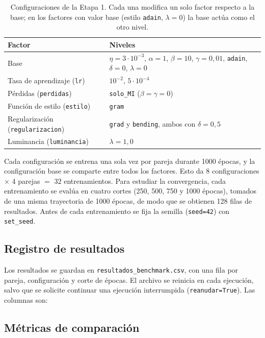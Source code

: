 \documentclass[a4paper]{article}
\begin{document}
\begin{table}[h]
\centering
\begin{tabularx}{\textwidth}{|l|X|}
\hline
\textbf{Factor} & \textbf{Niveles} \\
\hline
Base & $\eta=3\cdot10^{-3}$, $\alpha=1$, $\beta=10$, $\gamma=0{,}01$, \texttt{adain}, $\delta=0$, $\lambda=0$ \\
\hline
Tasa de aprendizaje (\texttt{lr}) & $10^{-2}$, $5\cdot10^{-4}$ \\
\hline
Pérdidas (\texttt{perdidas}) & \texttt{solo\_MI} ($\beta=\gamma=0$) \\
\hline
Función de estilo (\texttt{estilo}) & \texttt{gram} \\
\hline
Regularización (\texttt{regularizacion}) & \texttt{grad} y \texttt{bending}, ambos con $\delta=0{,}5$ \\
\hline
Luminancia (\texttt{luminancia}) & $\lambda=1{,}0$ \\
\hline
\end{tabularx}
\caption{Configuraciones de la Etapa 1. Cada una modifica un solo factor respecto a la base; en los factores con valor base (estilo \texttt{adain}, $\lambda=0$) la base actúa como el otro nivel.}
\end{table}

Cada configuración se entrena una sola vez por pareja durante 1000 épocas, y la configuración base se comparte entre todos los factores. Esto da 8 configuraciones $\times$ 4 parejas $=$ 32 entrenamientos. Para estudiar la convergencia, cada entrenamiento se evalúa en cuatro cortes (250, 500, 750 y 1000 épocas), tomados de una misma trayectoria de 1000 épocas, de modo que se obtienen 128 filas de resultados. Antes de cada entrenamiento se fija la semilla (\texttt{seed=42}) con \texttt{set\_seed}.

\subsection{Registro de resultados}

Los resultados se guardan en \texttt{resultados\_benchmark.csv}, con una fila por pareja, configuración y corte de épocas. El archivo se reinicia en cada ejecución, salvo que se solicite continuar una ejecución interrumpida (\texttt{reanudar=True}). Las columnas son:


\subsection{Métricas de comparación}
\end{document}
